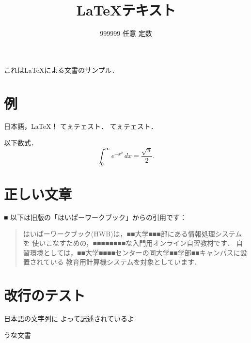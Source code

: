 \documentclass[b5paper]{jsarticle}
\title{\LaTeX テキスト}
\author{999999 任意 定数}
\begin{document}
    \maketitle
    これは\LaTeX による文書のサンプル．
    
    \section{例}
    日本語，\LaTeX！
    てぇテェスト．
    てぇ{}テェ{}スト．
    
    以下数式．
    \[
      \int_0^{\infty} e^{-x^2}\,dx=\frac{\sqrt{\pi}}{2}.
    \]
    
    \section{正しい文章}■
    以下は旧版の「はいぱーワークブック」からの引用です：
    \begin{quote}
      はいぱーワークブック(HWB)は，■■大学■■■部にある情報処理システムを
      使いこなすための，■■■■■■■■な入門用オンライン自習教材です．
      自習環境としては，■■大学■■■■センターの同大学■■学部■■キャンパスに設置されている
      教育用計算機システムを対象としています．
    \end{quote}

    \section{改行のテスト}
    日本語の文字列に
    よって記述されているよ
    
    うな文書

    
\end{document}
